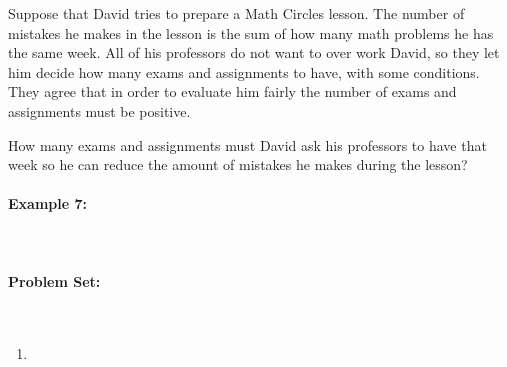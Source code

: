 \documentclass[english,12pt]{article}
\theoremstyle{plain}
\theoremstyle{definition}
\theoremstyle{definition} %
\newcommand{\enum}[1]{\begin{enumerate} #1 \end{enumerate}}
\begin{document}
Suppose that David tries to prepare a Math Circles lesson.  The number of mistakes he makes in the lesson is the sum of how many math problems he has the same week.  All of his professors do not want to over work David, so they let him decide how many exams and assignments to have, with some conditions.  They agree that in order to evaluate him fairly the number of exams and assignments must be positive.  

How many exams and assignments must David ask his professors to have that week so he can reduce the amount of mistakes he makes during the lesson?



\paragraph{Example 7:}\






\pagebreak
\paragraph{Problem Set:}\
\enum{
\item
}
\end{document}
